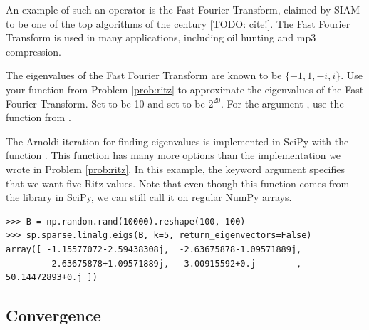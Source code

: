 An example of such an operator is the Fast Fourier Transform, claimed by SIAM to be one of the top algorithms of the century [TODO: cite!].
The Fast Fourier Transform is used in many applications, including oil hunting and mp3 compression.


\begin{problem}
\label{prob:fourier_eigs}
The eigenvalues of the Fast Fourier Transform are known to be $\{ -1, 1, -i, i \}$.
Use your function  from Problem \ref{prob:ritz} to approximate the eigenvalues of the Fast Fourier Transform.
Set  to be 10 and set  to be $2^{20}$.
For the argument , use the  function from .
\end{problem}

The Arnoldi iteration for finding eigenvalues is implemented in SciPy with the function .
This function has many more options than the implementation we wrote in Problem \ref{prob:ritz}.
In this example, the keyword argument  specifies that we want five Ritz values.
Note that even though this function comes from the  library in SciPy, we can still call it on regular NumPy arrays.

\begin{lstlisting}
>>> B = np.random.rand(10000).reshape(100, 100)
>>> sp.sparse.linalg.eigs(B, k=5, return_eigenvectors=False)
array([ -1.15577072-2.59438308j,  -2.63675878-1.09571889j,
        -2.63675878+1.09571889j,  -3.00915592+0.j        ,  50.14472893+0.j ])
\end{lstlisting}


\subsection*{Convergence}

